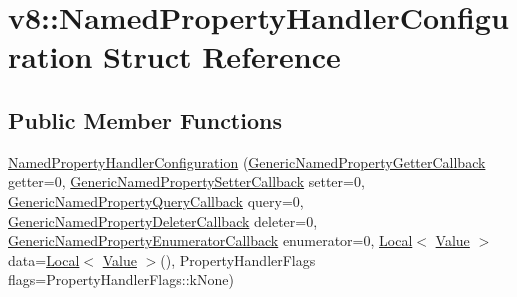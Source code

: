 \hypertarget{structv8_1_1_named_property_handler_configuration}{}\section{v8\+:\+:Named\+Property\+Handler\+Configuration Struct Reference}
\label{structv8_1_1_named_property_handler_configuration}
\subsection*{Public Member Functions}
\begin{DoxyCompactItemize}
\item 
\hyperlink{structv8_1_1_named_property_handler_configuration_a7304ee88edae7f7342f3a03f7974202d}{Named\+Property\+Handler\+Configuration} (\hyperlink{namespacev8_a24b1801fa53a7c5a71366d8044927563}{Generic\+Named\+Property\+Getter\+Callback} getter=0, \hyperlink{namespacev8_af74716c6e95a269c6cd4314662fd0a7e}{Generic\+Named\+Property\+Setter\+Callback} setter=0, \hyperlink{namespacev8_add9f7ab11e4a9a2b9ad2c4536b0e1a64}{Generic\+Named\+Property\+Query\+Callback} query=0, \hyperlink{namespacev8_ad2aecc0406ea4bc02d5a4f84a433b273}{Generic\+Named\+Property\+Deleter\+Callback} deleter=0, \hyperlink{namespacev8_a20826eb7e52e84fa4f632534e8eddd04}{Generic\+Named\+Property\+Enumerator\+Callback} enumerator=0, \hyperlink{classv8_1_1_local}{Local}$<$ \hyperlink{classv8_1_1_value}{Value} $>$ data=\hyperlink{classv8_1_1_local}{Local}$<$ \hyperlink{classv8_1_1_value}{Value} $>$(), Property\+Handler\+Flags flags=Property\+Handler\+Flags\+::k\+None)
\end{DoxyCompactItemize}
